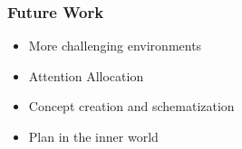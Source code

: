 \documentclass[aspectratio=169]{beamer}
\begin{document}
\begin{frame}
  \frametitle{Future Work}


  \begin{itemize}
  \item More challenging environments
  \item Attention Allocation
  \item Concept creation and schematization
  \item Plan in the inner world
  \end{itemize}
\end{frame}
\end{document}

